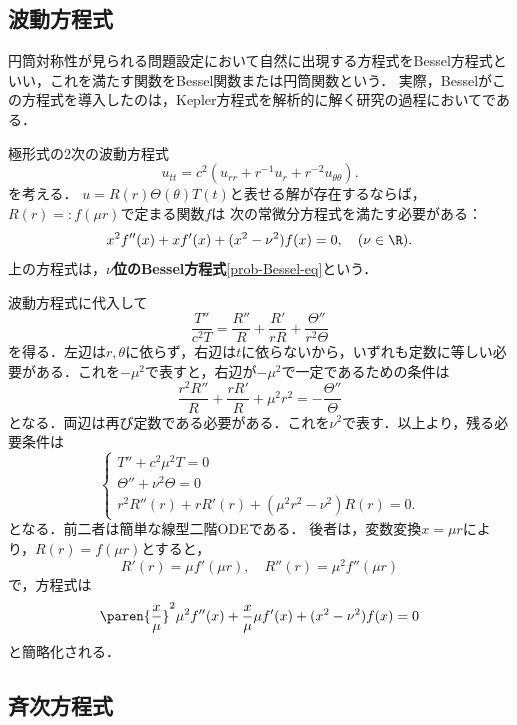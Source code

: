 \documentclass[uplatex,dvipdfmx]{jsreport}
\begin{document}
\subsection{波動方程式}


\begin{tcolorbox}[colframe=ForestGreen, colback=ForestGreen!10!white,breakable,colbacktitle=ForestGreen!40!white,coltitle=black,fonttitle=\bfseries\sffamily,
    title=]
    円筒対称性が見られる問題設定において自然に出現する方程式をBessel方程式といい，これを満たす関数をBessel関数または円筒関数という．
    実際，Besselがこの方程式を導入したのは，Kepler方程式を解析的に解く研究の過程においてである．
\end{tcolorbox}

\begin{observation}[分離解の動径方向成分はBessel方程式を満たす]
    極形式の2次の波動方程式
    \[u_{tt}=c^2(u_{rr}+r^{-1}u_r+r^{-2}u_{\theta\theta}).\]
    を考える．
    $u=R(r)\Theta(\theta)T(t)$と表せる解が存在するならば，
    $R(r)=:f(\mu r)$で定まる関数$f$は
    次の常微分方程式を満たす必要がある：
    \[x^2f''(x)+xf'(x)+(x^2-\nu^2)f(x)=0,\quad(\nu\in\R).\]
    上の方程式は，\textbf{$\nu$位のBessel方程式}\ref{prob-Bessel-eq}という．
\end{observation}
\begin{Proof}
    波動方程式に代入して
    \[\frac{T''}{c^2T}=\frac{R''}{R}+\frac{R'}{rR}+\frac{\Theta''}{r^2\Theta}\]
    を得る．左辺は$r,\theta$に依らず，右辺は$t$に依らないから，いずれも定数に等しい必要がある．これを$-\mu^2$で表すと，右辺が$-\mu^2$で一定であるための条件は
    \[\frac{r^2R''}{R}+\frac{rR'}{R}+\mu^2r^2=-\frac{\Theta''}{\Theta}\]
    となる．両辺は再び定数である必要がある．これを$\nu^2$で表す．以上より，残る必要条件は
    \[\begin{cases}
        T''+c^2\mu^2T=0\\
        \Theta''+\nu^2\Theta=0\\
        r^2R''(r)+rR'(r)+(\mu^2r^2-\nu^2)R(r)=0.
    \end{cases}\]
    となる．前二者は簡単な線型二階ODEである．
    後者は，変数変換$x=\mu r$により，$R(r)=f(\mu r)$とすると，
    \[R'(r)=\mu f'(\mu r),\quad R''(r)=\mu^2 f''(\mu r)\]
    で，方程式は
    \[\paren{\frac{x}{\mu}}^2\mu^2f''(x)+\frac{x}{\mu}\mu f'(x)+(x^2-\nu^2)f(x)=0\]
    と簡略化される．
\end{Proof}

\subsection{斉次方程式}
\end{document}
